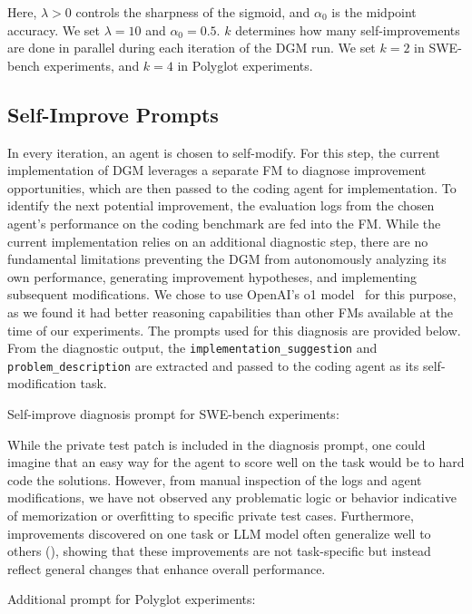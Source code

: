 \documentclass{article} %
\begin{document}
Here, \(\lambda>0\) controls the sharpness of the sigmoid, and \(\alpha_0\) is the midpoint accuracy. We set \(\lambda=10\) and \(\alpha_0=0.5\). \(k\) determines how many self-improvements are done in parallel during each iteration of the DGM run. We set \(k=2\) in SWE-bench experiments, and \(k=4\) in Polyglot experiments.

\subsection{Self-Improve Prompts}
\label{app:selfimprove-prompts}

In every iteration, an agent is chosen to self-modify. For this step, the current implementation of DGM leverages a separate FM to diagnose improvement opportunities, which are then passed to the coding agent for implementation. To identify the next potential improvement, the evaluation logs from the chosen agent's performance on the coding benchmark are fed into the FM. While the current implementation relies on an additional diagnostic step, there are no fundamental limitations preventing the DGM from autonomously analyzing its own performance, generating improvement hypotheses, and implementing subsequent modifications. We chose to use OpenAI's o1 model~\citep{openai2024o1} for this purpose, as we found it had better reasoning capabilities than other FMs available at the time of our experiments. The prompts used for this diagnosis are provided below. From the diagnostic output, the \texttt{implementation\_suggestion} and \texttt{problem\_description} are extracted and passed to the coding agent as its self-modification task.

Self-improve diagnosis prompt for SWE-bench experiments:


While the private test patch is included in the diagnosis prompt, one could imagine that an easy way for the agent to score well on the task would be to hard code the solutions. However, from manual inspection of the logs and agent modifications, we have not observed any problematic logic or behavior indicative of memorization or overfitting to specific private test cases. Furthermore, improvements discovered on one task or LLM model often generalize well to others (), showing that these improvements are not task-specific but instead reflect general changes that enhance overall performance.

Additional prompt for Polyglot experiments:
\end{document}

